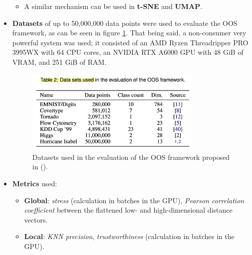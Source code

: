 \documentclass[a4paper,12pt]{article}
\begin{document}
\begin{itemize}
\begin{itemize}
        \item A similar mechanism can be used in \textbf{t-SNE} and \textbf{UMAP}.
    \end{itemize}
    \item \textbf{Datasets} of up to 50,000,000 data points were used to evaluate the OOS framework, as can be seen in figure \ref{fig:OOS_datasets}. That being said, a non-consumer very powerful system was used; it consisted of an AMD Ryzen Threadripper PRO 3995WX with 64 CPU cores, an NVIDIA RTX A6000 GPU with 48 GiB of VRAM, and 251 GiB of RAM.
    
    \begin{figure}[ht]
        \centering
        \includegraphics[width=0.8\textwidth]{figures/OOS_datasets.png}
        \caption{Datasets used in the evaluation of the OOS framework proposed in (\cite{Reichmann2024}).}
        \label{fig:OOS_datasets}
    \end{figure}
    
    \item \textbf{Metrics} used:
    \begin{itemize}
        \item \textbf{Global}: \textit{stress} (calculation in batches in the GPU), \textit{Pearson correlation coefficient} between the flattened low- and high-dimensional distance vectors.
        \item \textbf{Local}: \textit{KNN precision}, \textit{trustworthiness} (calculation in batches in the GPU).
    \end{itemize}
    

\end{itemize}
\end{document}
